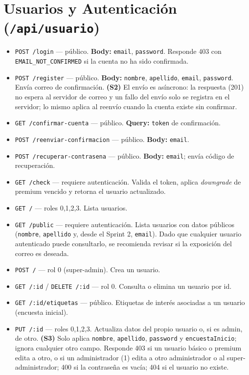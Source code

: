 \section{Usuarios y Autenticación (\texttt{/api/usuario})}
\begin{itemize}
    \item \texttt{POST /login} — público. \textbf{Body:} \texttt{email}, \texttt{password}. Responde 403 con \texttt{EMAIL\_NOT\_CONFIRMED} si la cuenta no ha sido confirmada.
    \item \texttt{POST /register} — público. \textbf{Body:} \texttt{nombre}, \texttt{apellido}, \texttt{email}, \texttt{password}. Envía correo de confirmación. \textbf{(S2)} El envío es asíncrono: la respuesta (201) no espera al servidor de correo y un fallo del envío solo se registra en el servidor; lo mismo aplica al reenvío cuando la cuenta existe sin confirmar.
    \item \texttt{GET /confirmar-cuenta} — público. \textbf{Query:} \texttt{token} de confirmación.
    \item \texttt{POST /reenviar-confirmacion} — público. \textbf{Body:} \texttt{email}.
    \item \texttt{POST /recuperar-contrasena} — público. \textbf{Body:} \texttt{email}; envía código de recuperación.
    \item \texttt{GET /check} — requiere autenticación. Valida el token, aplica \textit{downgrade} de premium vencido y retorna el usuario actualizado.
    \item \texttt{GET /} — roles 0,1,2,3. Lista usuarios.
    \item \texttt{GET /public} — requiere autenticación. Lista usuarios con datos públicos (\texttt{nombre}, \texttt{apellido} y, desde el Sprint 2, \texttt{email}). Dado que cualquier usuario autenticado puede consultarlo, se recomienda revisar si la exposición del correo es deseada.
    \item \texttt{POST /} — rol 0 (super-admin). Crea un usuario.
    \item \texttt{GET /:id} / \texttt{DELETE /:id} — rol 0. Consulta o elimina un usuario por id.
    \item \texttt{GET /:id/etiquetas} — público. Etiquetas de interés asociadas a un usuario (encuesta inicial).
    \item \texttt{PUT /:id} — roles 0,1,2,3. Actualiza datos del propio usuario o, si es admin, de otro. \textbf{(S3)} Solo aplica \texttt{nombre}, \texttt{apellido}, \texttt{password} y \texttt{encuestaInicio}; ignora cualquier otro campo. Responde 403 si un usuario básico o premium edita a otro, o si un administrador (1) edita a otro administrador o al super-administrador; 400 si la contraseña es vacía; 404 si el usuario no existe.

\end{itemize}
